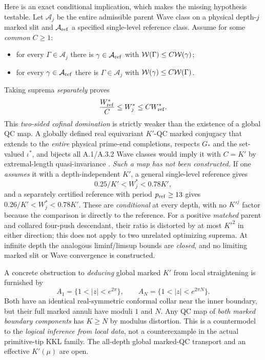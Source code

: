 Here is an exact
conditional implication,
which makes the missing
hypothesis testable.
Let $\mathcal A_j$ be
the entire admissible
parent Wave class
on a physical depth-$j$
marked slit and
$\mathcal A_{\rm ref}$
a specified single-level
reference class.  Assume
for some \emph{common}
$C\ge1$:
\begin{itemize}
\item for every $\Gamma\in\mathcal A_j$
there is $\gamma\in\mathcal A_{\rm ref}$
with $\mathcal W(\Gamma)\le C\mathcal W(\gamma)$;
\item for every $\gamma\in\mathcal A_{\rm ref}$
there is $\Gamma\in\mathcal A_j$
with $\mathcal W(\gamma)\le C\mathcal W(\Gamma)$.
\end{itemize}
Taking suprema \emph{separately}
proves
\begin{equation}\label{eq:depth}
 \frac{W_{\rm ref}^*}{C}
 \le W_j^*\le C W_{\rm ref}^*.
\end{equation}
This \emph{two-sided
cofinal domination}
is strictly weaker than
the existence of a
global QC map.  A
globally defined real
equivariant $K'$-QC
marked conjugacy that
extends to the \emph{entire}
physical prime-end
completions, respects
$G_*$ and the set-valued
$\iota^*$, and
bijects all A.1/A.3.2
Wave classes would
imply it with $C=K'$
by extremal-length
quasi-invariance
\cite{AhlforsQC1966}.
\emph{Such a map has
not been constructed.}
If one \emph{assumes}
it with a depth-independent
$K'$, a general
single-level reference
gives
\[
 0.25/K'<W_j^*<0.78K',
\]
and a separately certified
reference with period
$p_{\rm ref}\ge13$ gives
$0.26/K'<W_j^*<0.78K'$.
These are \emph{conditional}
at every depth, with no
$K'^j$ factor because
the comparison is directly
to the reference.
For a positive \emph{matched}
parent and collared
four-push descendant,
their ratio is distorted
by at most $K'^2$
in either direction;
this does not apply
to two unrelated
optimizing suprema.
At infinite depth the
analogous liminf/limsup
bounds are \emph{closed},
and no limiting marked
slit or Wave convergence
is constructed.

A concrete obstruction
to \emph{deducing}
global marked $K'$
from local straightening
is furnished by
\[
 A_1=\{1<|z|<e^{2\pi}\},\qquad
 A_N=\{1<|z|<e^{2\pi N}\}.
\]
Both have an identical
real-symmetric conformal
collar near the inner
boundary, but their
full marked annuli
have moduli $1$ and
$N$.  Any QC map of
\emph{both marked
boundary components}
has $K\ge N$ by
modulus distortion.
This is a countermodel
to the \emph{logical
inference from local
data}, not a
counterexample in the
actual primitive-tip
KKL family.
The all-depth global
marked-QC transport
and an effective
$K'(\mu)$ are open.

